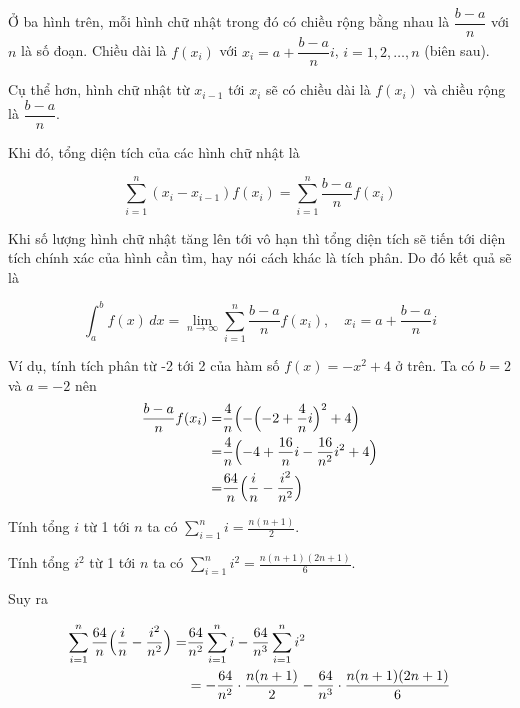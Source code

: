 Ở ba hình trên, mỗi hình chữ nhật trong đó có chiều rộng bằng nhau là $\dfrac{b-a}{n}$ với $n$ là số đoạn. Chiều dài là $f(x_i)$ với $x_i = a + \dfrac{b-a}{n} i$, $i = 1, 2, \ldots, n$ (biên sau).

Cụ thể hơn, hình chữ nhật từ $x_{i-1}$ tới $x_i$ sẽ có chiều dài là $f(x_i)$ và chiều rộng là $\dfrac{b-a}{n}$. %

Khi đó, tổng diện tích của các hình chữ nhật là

\begin{equation}
	\sum_{i=1}^n (x_{i} - x_{i-1}) f(x_i) = \sum_{i=1}^n \frac{b-a}{n} f(x_i)
\end{equation}

Khi số lượng hình chữ nhật tăng lên tới vô hạn thì tổng diện tích sẽ tiến tới diện tích chính xác của hình cần tìm, hay nói cách khác là tích phân. Do đó kết quả sẽ là

\begin{equation}
	\int_{a}^{b} f(x)\,dx = \lim_{n \to \infty} \sum_{i=1}^{n} \frac{b-a}{n} f(x_i), \quad x_i = a + \frac{b-a}{n} i
\end{equation}

Ví dụ, tính tích phân từ -2 tới 2 của hàm số $f(x) = -x^2 + 4$ ở trên. Ta có $b = 2$ và $a = -2$ nên \begin{align*}
	\frac{b-a}{n} f(x_i) = & \frac{4}{n} \Bigl(-\Bigl(-2+\frac{4}{n} i\Bigr)^2 + 4\Bigr) \\ = & \frac{4}{n}\Bigl( -4 + \frac{16}{n} i - \frac{16}{n^2} i^2 + 4\Bigr) \\ = & \frac{64}{n} \Bigl( \frac{i}{n} - \frac{i^2}{n^2} \Bigr)
\end{align*}

Tính tổng $i$ từ 1 tới $n$ ta có $\displaystyle{\sum_{i=1}^{n} i = \frac{n(n+1)}{2}}$.

Tính tổng $i^2$ từ 1 tới $n$ ta có $\displaystyle{\sum_{i=1}^{n} i^2 = \frac{n(n+1)(2n+1)}{6}}$.

Suy ra

\begin{align*}
	\sum_{i=1}^n \frac{64}{n} \Bigl(\frac{i}{n} - \frac{i^2}{n^2}\Bigr) = & \frac{64}{n^2} \sum_{i=1}^n i - \frac{64}{n^3} \sum_{i=1}^{n} i^2 \\ & = -\frac{64}{n^2} \cdot \frac{n(n+1)}{2} - \frac{64}{n^3} \cdot \frac{n(n+1)(2n+1)}{6}
\end{align*}

